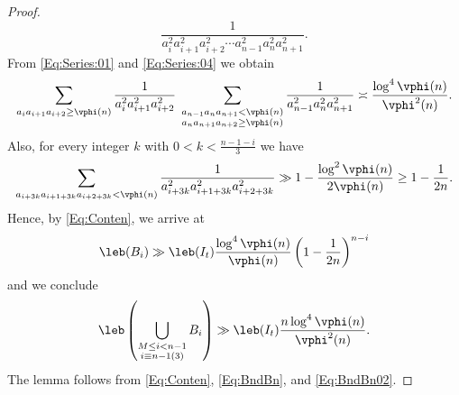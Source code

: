 \documentclass[12pt,a4paper]{amsart}
\begin{document}
\begin{proof}
{\[\frac{1}{a_{i}^2a_{i+1}^2a_{i+2}^2 \cdots a_{n-1}^2a_{n}^2a_{n+1}^2}.
\]
}
From \eqref{Eq:Series:01} and \eqref{Eq:Series:04} we obtain
\[
\sum_{a_{i}a_{i+1}a_{i+2} \geq \vphi(n)} 
\frac{1}{a_{i}^2a_{i+1}^2a_{i+2}^2 }
\;
\sum_{\substack{a_{n-1}a_n  a_{n+1}< \vphi(n) \\ a_{n}a_{n+1}a_{n+2} \geq  \vphi(n)}} 
\frac{1}{a_{n-1}^2a_{n}^2a_{n+1}^2}
\asymp 
\frac{\log^{4} \vphi(n) }{\vphi^2(n)}.
\]
Also, for every integer $k$ with $0<k<\frac{n-1 - i}{3}$ we have
\[
\sum_{a_{i+3k}a_{i+1+3k}a_{i+2 + 3k}  < \vphi(n)}
\frac{1}{a_{i+3k}^2a_{i+1+3k}^2a_{i+2+3k}^2 }
\gg 1- \frac{\log^{2}\vphi(n)}{2\vphi(n)}
\geq 1- \frac{1}{2n}.
\]
Hence, by \eqref{Eq:Conten}, we arrive at 
\[
\leb(B_i)
\gg 
\leb(I_t)
\frac{\log^{4}\vphi(n)}{\vphi(n)}\left(1-\frac{1}{2n}\right)^{n-i}
\]
and we conclude
\begin{equation}\label{Eq:BndBn02}
\leb\left(\bigcup_{\substack{M\leq i<n-1\\ i\equiv n-1 (3)}} B_i\right)
\gg
\leb(I_t)
\frac{n\log^{4}\vphi(n)}{\vphi^2(n)}.
\end{equation}
The lemma follows from \eqref{Eq:Conten}, \eqref{Eq:BndBn}, and \eqref{Eq:BndBn02}.
\end{proof} 
\end{document}
